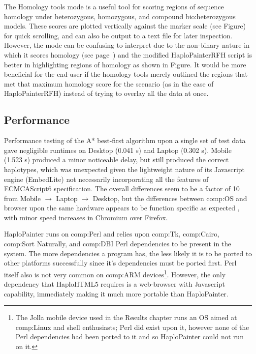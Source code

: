 The Homology tools mode is a useful tool for scoring regions of sequence homology under heterozygous, homozygous, and compound \gls{bio:heterozygous} models. These scores are plotted vertically against the marker scale (see Figure) for quick scrolling, and can also be output to a text file for later inspection. However, the mode can be confusing to interpret due to the non-binary nature in which it scores homology (see page~\pageref{ref:haplo:homologyscoredet}) and the modified HaploPainterRFH script is better in highlighting regions of homology as shown in Figure. It would be more beneficial for the end-user if the homology tools merely outlined the regions that met that maximum homology score for the scenario (as in the case of HaploPainterRFH) instead of trying to overlay all the data at once.

\subsection{Performance}

Performance testing of the A* best-first algorithm upon a single set of test data gave negligible runtimes on Desktop (0.041 s) and Laptop (0.302 s). Mobile (1.523 s) produced a minor noticeable delay, but still produced the correct haplotypes, which was unexpected given the lightweight nature of its Javascript engine (EmbedLite) not necessarily incorporating all the features of ECMCAScript6 specification. The overall differences seem to be a factor of 10 from Mobile $\rightarrow$ Laptop $\rightarrow$ Desktop, but the differences between \gls{comp:OS} and browser upon the same hardware appears to be function specific as expected \cite{ratanaworabhan2010jsmeter}, with minor speed increases in Chromium over Firefox.

HaploPainter runs on \gls{comp:Perl} and relies upon \gls{comp:Tk}, \gls{comp:Cairo}, \gls{comp:Sort Naturally}, and \gls{comp:DBI} Perl dependencies to be present in the system. The more dependencies a program has, the less likely it is to be ported to other platforms successfully since it's dependencies must be ported first. Perl itself also is not very common on \gls{comp:ARM} devices\footnote{The Jolla mobile device used in the Results chapter runs an OS aimed at \gls{comp:Linux} and shell enthusiasts; Perl did exist upon it, however none of the Perl dependencies had been ported to it and so HaploPainter could not run on it.}. However, the only dependency that HaploHTML5 requires is a web-browser with Javascript capability, immediately making it much more portable than HaploPainter.


